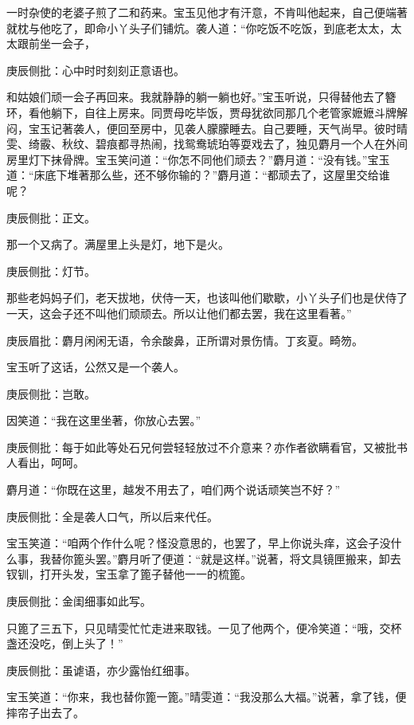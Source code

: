\begin{parag}


    一时杂使的老婆子煎了二和药来。宝玉见他才有汗意，不肯叫他起来，自己便端著就枕与他吃了，即命小丫头子们铺炕。袭人道：“你吃饭不吃饭，到底老太太，太太跟前坐一会子，\begin{note}庚辰侧批：心中时时刻刻正意语也。\end{note}和姑娘们顽一会子再回来。我就静静的躺一躺也好。”宝玉听说，只得替他去了簪环，看他躺下，自往上房来。同贾母吃毕饭，贾母犹欲同那几个老管家嬷嬷斗牌解闷，宝玉记著袭人，便回至房中，见袭人朦朦睡去。自己要睡，天气尚早。彼时晴雯、绮霰、秋纹、碧痕都寻热闹，找鸳鸯琥珀等耍戏去了，独见麝月一个人在外间房里灯下抹骨牌。宝玉笑问道：“你怎不同他们顽去？”麝月道：“没有钱。”宝玉道：“床底下堆著那么些，还不够你输的？”麝月道：“都顽去了，这屋里交给谁呢？\begin{note}庚辰侧批：正文。\end{note}那一个又病了。满屋里上头是灯，地下是火。\begin{note}庚辰侧批：灯节。\end{note}那些老妈妈子们，老天拔地，伏侍一天，也该叫他们歇歇，小丫头子们也是伏侍了一天，这会子还不叫他们顽顽去。所以让他们都去罢，我在这里看著。”\begin{note}庚辰眉批：麝月闲闲无语，令余酸鼻，正所谓对景伤情。丁亥夏。畸笏。\end{note}
\end{parag}


\begin{parag}


    宝玉听了这话，公然又是一个袭人。\begin{note}庚辰侧批：岂敢。\end{note}因笑道：“我在这里坐著，你放心去罢。”\begin{note}庚辰侧批：每于如此等处石兄何尝轻轻放过不介意来？亦作者欲瞒看官，又被批书人看出，呵呵。\end{note}麝月道：“你既在这里，越发不用去了，咱们两个说话顽笑岂不好？”\begin{note}庚辰侧批：全是袭人口气，所以后来代任。\end{note}宝玉笑道：“咱两个作什么呢？怪没意思的，也罢了，早上你说头痒，这会子没什么事，我替你篦头罢。”麝月听了便道：“就是这样。”说著，将文具镜匣搬来，卸去钗钏，打开头发，宝玉拿了篦子替他一一的梳篦。\begin{note}庚辰侧批：金闺细事如此写。\end{note}只篦了三五下，只见晴雯忙忙走进来取钱。一见了他两个，便冷笑道：“哦，交杯盏还没吃，倒上头了！”\begin{note}庚辰侧批：虽谑语，亦少露怡红细事。\end{note}宝玉笑道：“你来，我也替你篦一篦。”晴雯道：“我没那么大福。”说著，拿了钱，便摔帘子出去了。
\end{parag}


